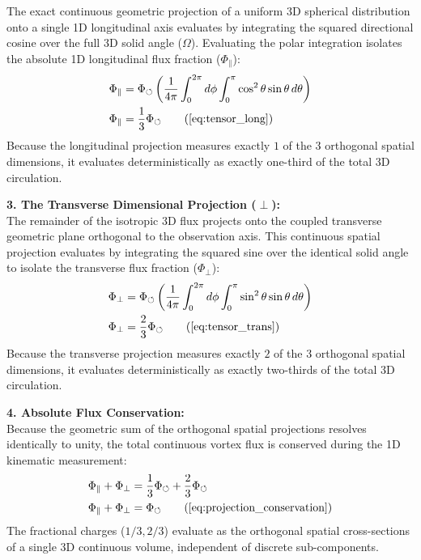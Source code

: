 \documentclass[11pt, a4paper]{article}
\begin{document}
The exact continuous geometric projection of a uniform 3D spherical distribution onto a single 1D longitudinal axis evaluates by integrating the squared directional cosine over the full 3D solid angle ($\Omega$). Evaluating the polar integration isolates the absolute 1D longitudinal flux fraction ($\Phi_{\parallel}$):
\begin{align}
    \Phi_{\parallel} &= \Phi_{\circlearrowleft} \left( \frac{1}{4\pi} \int_{0}^{2\pi} d\phi \int_{0}^{\pi} \cos^2 \theta \sin \theta \, d\theta \right) \nonumber \\
    \Phi_{\parallel} &= \frac{1}{3} \Phi_{\circlearrowleft} \tag{\ref{eq:tensor_long}}
\end{align}
Because the longitudinal projection measures exactly $1$ of the $3$ orthogonal spatial dimensions, it evaluates deterministically as exactly one-third of the total 3D circulation.

\textbf{3. The Transverse Dimensional Projection ($\perp$):} \\
The remainder of the isotropic 3D flux projects onto the coupled transverse geometric plane orthogonal to the observation axis. This continuous spatial projection evaluates by integrating the squared sine over the identical solid angle to isolate the transverse flux fraction ($\Phi_{\perp}$):
\begin{align}
    \Phi_{\perp} &= \Phi_{\circlearrowleft} \left( \frac{1}{4\pi} \int_{0}^{2\pi} d\phi \int_{0}^{\pi} \sin^2 \theta \sin \theta \, d\theta \right) \nonumber \\
    \Phi_{\perp} &= \frac{2}{3} \Phi_{\circlearrowleft} \tag{\ref{eq:tensor_trans}}
\end{align}
Because the transverse projection measures exactly $2$ of the $3$ orthogonal spatial dimensions, it evaluates deterministically as exactly two-thirds of the total 3D circulation.

\textbf{4. Absolute Flux Conservation:} \\
Because the geometric sum of the orthogonal spatial projections resolves identically to unity, the total continuous vortex flux is   conserved during the 1D kinematic measurement:
\begin{align}
    \Phi_{\parallel} + \Phi_{\perp} &= \frac{1}{3}\Phi_{\circlearrowleft} + \frac{2}{3}\Phi_{\circlearrowleft} \nonumber \\
    \Phi_{\parallel} + \Phi_{\perp} &= \Phi_{\circlearrowleft} \tag{\ref{eq:projection_conservation}}
\end{align}
The fractional charges ($1/3, 2/3$) evaluate as the orthogonal spatial cross-sections of a single 3D continuous volume, independent of discrete sub-components.
\end{document}
